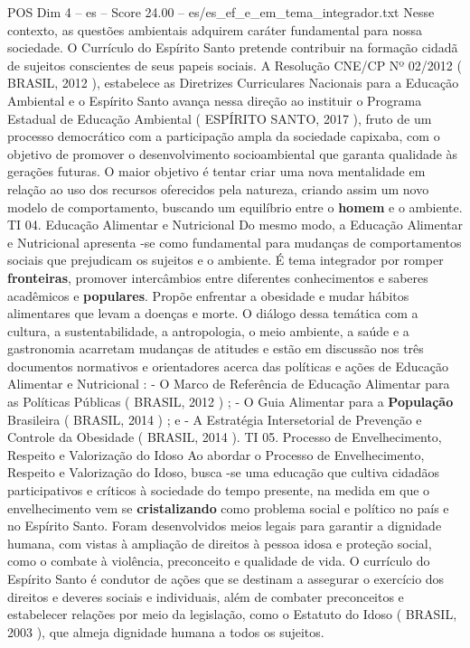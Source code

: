 \begin{textsample}{POS Dim 4 – es – Score 24.00 – es/es\_ef\_e\_em\_tema\_integrador.txt}
Nesse contexto, as questões ambientais adquirem caráter fundamental para nossa sociedade.
O Currículo do Espírito Santo pretende contribuir na formação cidadã de sujeitos conscientes de seus papeis sociais.
A Resolução CNE/CP Nº 02/2012 ( BRASIL, 2012 ), estabelece as Diretrizes Curriculares Nacionais para a Educação Ambiental e o Espírito Santo avança nessa direção ao instituir o Programa Estadual de Educação Ambiental ( ESPÍRITO SANTO, 2017 ), fruto de um processo democrático com a participação ampla da sociedade capixaba, com o objetivo de promover o desenvolvimento socioambiental que garanta qualidade às gerações futuras.
O maior objetivo é tentar criar uma nova mentalidade em relação ao uso dos recursos oferecidos pela natureza, criando assim um novo modelo de comportamento, buscando um equilíbrio entre o \textbf{homem} e o ambiente.
TI 04.
Educação Alimentar e Nutricional Do mesmo modo, a Educação Alimentar e Nutricional apresenta -se como fundamental para mudanças de comportamentos sociais que prejudicam os sujeitos e o ambiente.
É tema integrador por romper \textbf{fronteiras}, promover intercâmbios entre diferentes conhecimentos e saberes acadêmicos e \textbf{populares}.
Propõe enfrentar a obesidade e mudar hábitos alimentares que levam a doenças e morte.
O diálogo dessa temática com a cultura, a sustentabilidade, a antropologia, o meio ambiente, a saúde e a gastronomia acarretam mudanças de atitudes e estão em discussão nos três documentos normativos e orientadores acerca das políticas e ações de Educação Alimentar e Nutricional : - O Marco de Referência de Educação Alimentar para as Políticas Públicas ( BRASIL, 2012 ) ; - O Guia Alimentar para a \textbf{População} Brasileira ( BRASIL, 2014 ) ; e - A Estratégia Intersetorial de Prevenção e Controle da Obesidade ( BRASIL, 2014 ).
TI 05.
Processo de Envelhecimento, Respeito e Valorização do Idoso Ao abordar o Processo de Envelhecimento, Respeito e Valorização do Idoso, busca -se uma educação que cultiva cidadãos participativos e críticos à sociedade do tempo presente, na medida em que o envelhecimento vem se \textbf{cristalizando} como problema social e político no país e no Espírito Santo.
Foram desenvolvidos meios legais para garantir a dignidade humana, com vistas à ampliação de direitos à pessoa idosa e proteção social, como o combate à violência, preconceito e qualidade de vida.
O currículo do Espírito Santo é condutor de ações que se destinam a assegurar o exercício dos direitos e deveres sociais e individuais, além de combater preconceitos e estabelecer relações por meio da legislação, como o Estatuto do Idoso ( BRASIL, 2003 ), que almeja dignidade humana a todos os sujeitos.

\end{textsample}
